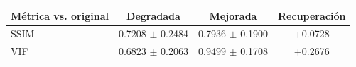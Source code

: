 \begin{tabular}{lccc}
\hline
\textbf{Métrica vs. original} & \textbf{Degradada} & \textbf{Mejorada} & \textbf{Recuperación} \\
\hline
SSIM & 0.7208 $\pm$ 0.2484 & 0.7936 $\pm$ 0.1900 & +0.0728 \\
VIF & 0.6823 $\pm$ 0.2063 & 0.9499 $\pm$ 0.1708 & +0.2676 \\
\hline
\end{tabular}